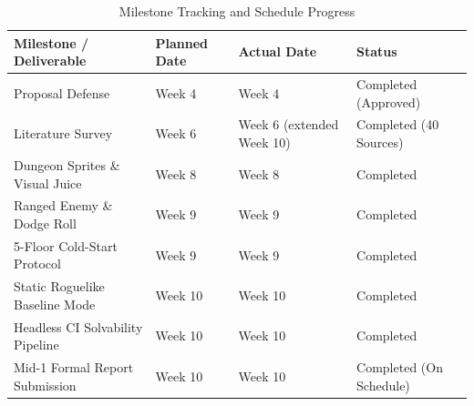 \begin{table}[!htbp]
\centering
\caption{Milestone Tracking and Schedule Progress}
\label{tab:milestones}
\small
\begin{tabular}{p{}p{}p{}p{}}
\toprule
\textbf{Milestone / Deliverable} & \textbf{Planned Date} & \textbf{Actual Date} & \textbf{Status} \\
\midrule
Proposal Defense & Week 4 & Week 4 & Completed (Approved) \\
Literature Survey & Week 6 & Week 6 (extended Week 10) & Completed (40 Sources) \\
Dungeon Sprites \& Visual Juice & Week 8 & Week 8 & Completed \\
Ranged Enemy \& Dodge Roll & Week 9 & Week 9 & Completed \\
5-Floor Cold-Start Protocol & Week 9 & Week 9 & Completed \\
Static Roguelike Baseline Mode & Week 10 & Week 10 & Completed \\
Headless CI Solvability Pipeline & Week 10 & Week 10 & Completed \\
Mid-1 Formal Report Submission & Week 10 & Week 10 & Completed (On Schedule) \\
\bottomrule
\end{tabular}
\end{table}

